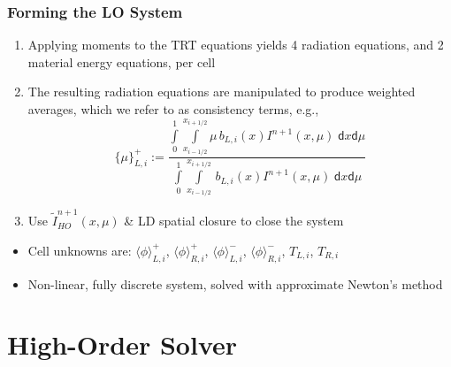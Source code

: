 \documentclass[xcolor=dvipsnames,hyperref={pdfpagelabels=false},unknownkeysallowed]{beamer}
\newcommand{\colb}[1]{{\color{blue} #1}}
\newlength{\wideitemsep}
\let\olditem\item
\renewcommand{\item}{\setlength{\itemsep}{\wideitemsep}\olditem}
\renewcommand{\d}{\mathsf{d}}
\newcommand{\mom}[1]{\langle #1 \rangle}
\newcommand{\xl}{{x_{i-1/2}}}
\newcommand{\xr}{{x_{i+1/2}}}
\begin{document}
\begin{frame}
    \frametitle{Forming the LO System}
    \vspace{-0.1in}
    {\small
    \begin{enumerate}
      \item Applying moments to the TRT equations yields 4 radiation equations, and 2 material energy
          equations, per cell \pause \vspace{-0.062in}
    \item The resulting radiation equations are  manipulated to produce weighted
        averages, which we refer to as \colb{consistency
          terms}, e.g.,
    \begin{equation*}
\{{\mu}\}_{L,i}^{+} := \frac{\displaystyle 
    \int\limits_0^1 \int\limits_\xl^\xr \mu \, b_{L,i}(x) 
I^{n+1}(x,\mu) \;\d x \d \mu } 
{\displaystyle \int\limits_0^1 \int\limits_\xl^\xr \, b_{L,i}(x)
I^{n+1}(x,\mu)\; \d x \d \mu} 
    \end{equation*}
    \pause
    \vspace{-0.1in}
\item Use \colb{$\tilde{I}_{HO}^{n+1}(x,\mu)$} \& LD spatial closure to close the system
    \end{enumerate}
    \begin{itemize}
            \pause
        \item Cell unknowns are: $\mom{\phi}_{L,i}^{+}$, $\mom{\phi}_{R,i}^{+}$,
        $\mom{\phi}_{L,i}^{-}$, $\mom{\phi}_{R,i}^{-}$, $T_{L,i}$, $T_{R,i}$
     \item Non-linear, fully discrete system, solved with approximate Newton's method
 \end{itemize}


}
\end{frame}



\section{High-Order Solver}
\subsection{}
\end{document}

